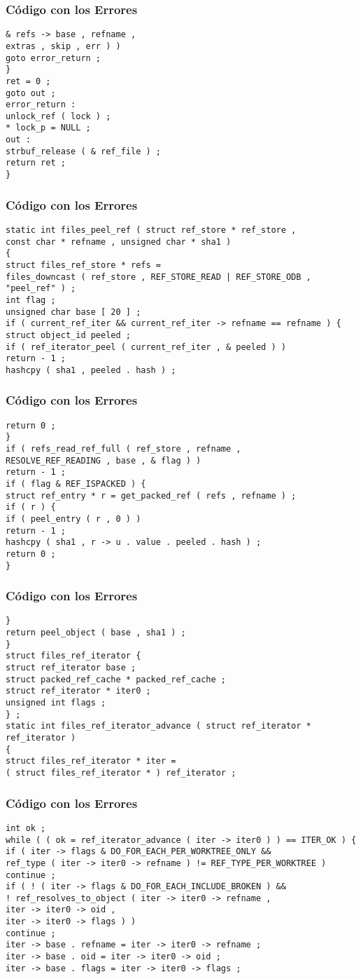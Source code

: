 \documentclass{beamer}
\begin{document}
\begin{frame}[fragile]
\frametitle{C\'odigo con los Errores}
\begin{verbatim}
& refs -> base , refname , 
extras , skip , err ) ) 
goto error_return ; 
} 
ret = 0 ; 
goto out ; 
error_return : 
unlock_ref ( lock ) ; 
* lock_p = NULL ; 
out : 
strbuf_release ( & ref_file ) ; 
return ret ; 
} 
\end{verbatim}
\end{frame}
\begin{frame}[fragile]
\frametitle{C\'odigo con los Errores}
\begin{verbatim}
static int files_peel_ref ( struct ref_store * ref_store , 
const char * refname , unsigned char * sha1 ) 
{ 
struct files_ref_store * refs = 
files_downcast ( ref_store , REF_STORE_READ | REF_STORE_ODB , 
"peel_ref" ) ; 
int flag ; 
unsigned char base [ 20 ] ; 
if ( current_ref_iter && current_ref_iter -> refname == refname ) { 
struct object_id peeled ; 
if ( ref_iterator_peel ( current_ref_iter , & peeled ) ) 
return - 1 ; 
hashcpy ( sha1 , peeled . hash ) ; 
\end{verbatim}
\end{frame}
\begin{frame}[fragile]
\frametitle{C\'odigo con los Errores}
\begin{verbatim}
return 0 ; 
} 
if ( refs_read_ref_full ( ref_store , refname , 
RESOLVE_REF_READING , base , & flag ) ) 
return - 1 ; 
if ( flag & REF_ISPACKED ) { 
struct ref_entry * r = get_packed_ref ( refs , refname ) ; 
if ( r ) { 
if ( peel_entry ( r , 0 ) ) 
return - 1 ; 
hashcpy ( sha1 , r -> u . value . peeled . hash ) ; 
return 0 ; 
} 
\end{verbatim}
\end{frame}
\begin{frame}[fragile]
\frametitle{C\'odigo con los Errores}
\begin{verbatim}
} 
return peel_object ( base , sha1 ) ; 
} 
struct files_ref_iterator { 
struct ref_iterator base ; 
struct packed_ref_cache * packed_ref_cache ; 
struct ref_iterator * iter0 ; 
unsigned int flags ; 
} ; 
static int files_ref_iterator_advance ( struct ref_iterator * ref_iterator ) 
{ 
struct files_ref_iterator * iter = 
( struct files_ref_iterator * ) ref_iterator ; 
\end{verbatim}
\end{frame}
\begin{frame}[fragile]
\frametitle{C\'odigo con los Errores}
\begin{verbatim}
int ok ; 
while ( ( ok = ref_iterator_advance ( iter -> iter0 ) ) == ITER_OK ) { 
if ( iter -> flags & DO_FOR_EACH_PER_WORKTREE_ONLY && 
ref_type ( iter -> iter0 -> refname ) != REF_TYPE_PER_WORKTREE ) 
continue ; 
if ( ! ( iter -> flags & DO_FOR_EACH_INCLUDE_BROKEN ) && 
! ref_resolves_to_object ( iter -> iter0 -> refname , 
iter -> iter0 -> oid , 
iter -> iter0 -> flags ) ) 
continue ; 
iter -> base . refname = iter -> iter0 -> refname ; 
iter -> base . oid = iter -> iter0 -> oid ; 
iter -> base . flags = iter -> iter0 -> flags ; 
\end{verbatim}
\end{frame}
\end{document}
